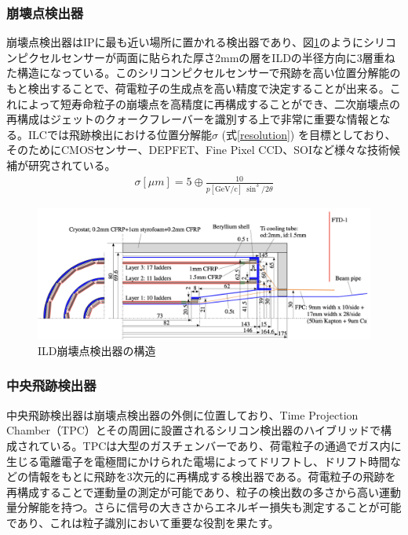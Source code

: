 \subsubsection{崩壊点検出器}
崩壊点検出器はIPに最も近い場所に置かれる検出器であり、図\ref{vertexdetector}のようにシリコンピクセルセンサーが両面に貼られた厚さ2mmの層をILDの半径方向に3層重ねた構造になっている。このシリコンピクセルセンサーで飛跡を高い位置分解能のもと検出することで、荷電粒子の生成点を高い精度で決定することが出来る。これによって短寿命粒子の崩壊点を高精度に再構成することができ、二次崩壊点の再構成はジェットのクォークフレーバーを識別する上で非常に重要な情報となる。ILCでは飛跡検出における位置分解能$\sigma$ (式\ref{resolution}) を目標としており、そのためにCMOSセンサー、DEPFET、Fine Pixel CCD、SOIなど様々な技術候補が研究されている。
\begin{align}
\label{resolution}
\sigma [\mu m] = 5 \oplus \frac{10} {p[\mathrm{GeV/c}] \ {\sin^3/2{\theta}}}
\end{align}
\begin{figure}[H]
	\begin{center}
 \includegraphics[keepaspectratio, scale=0.3]
 	{Figure/Introduction/vertexdetector.png}
 		\caption {ILD崩壊点検出器の構造}
 		\label{vertexdetector}
	\end{center}
\end{figure}
\subsubsection{中央飛跡検出器}
中央飛跡検出器は崩壊点検出器の外側に位置しており、Time Projection Chamber（TPC）とその周囲に設置されるシリコン検出器のハイブリッドで構成されている。TPCは大型のガスチェンバーであり、荷電粒子の通過でガス内に生じる電離電子を電極間にかけられた電場によってドリフトし、ドリフト時間などの情報をもとに飛跡を3次元的に再構成する検出器である。荷電粒子の飛跡を再構成することで運動量の測定が可能であり、粒子の検出数の多さから高い運動量分解能を持つ。さらに信号の大きさからエネルギー損失も測定することが可能であり、これは粒子識別において重要な役割を果たす。
